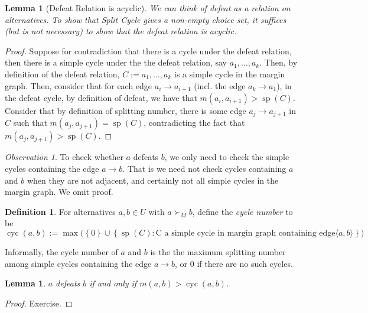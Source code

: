 \documentclass{book}
\theoremstyle{plain}
\newtheorem{lemma}[theorem]{Lemma}
\theoremstyle{definition}
\newtheorem{definition}[theorem]{Definition}
\theoremstyle{remark}
\newtheorem{observation}[theorem]{Observation}
\newcommand{\set}[1]{\left\{#1\right\}}
\begin{document}
\begin{lemma}[Defeat Relation is acyclic]
    We can think of \emph{defeat} as a relation on alternatives.
    To show that 
    Split Cycle gives a non-empty 
    choice set, it suffices
    (but is not necessary) to show that
    the defeat relation is acyclic.
\end{lemma}
\begin{proof}
    Suppose for contradiction that 
    there is a cycle under the defeat relation,
    then there is a 
    simple cycle under the 
    the defeat relation, say 
    $a_1, \dots, a_k$.
    Then, by definition of the defeat relation,
    $C := a_1, \dots, a_k$ is a simple cycle in the 
    margin graph.
    Then, consider that 
    for each edge $a_i \to a_{i+1}$ (incl. the edge $a_k \to a_1$),
    in the defeat cycle, 
    by definition of defeat, we have that $m(a_i, a_{i+1}) > \operatorname{sp}(C)$.
    Consider that by definition of splitting number, there is some edge $a_j \to a_{j+1}$ in $C$ such that
    $m(a_j, a_{j+1}) = \operatorname{sp}(C)$, contradicting 
    the fact that $m(a_j, a_{j+1}) > \operatorname{sp}(C)$.
\end{proof}

\begin{observation}
    To check whether 
    $a$ defeats $b$, we only need to check the simple cycles containing 
    the edge $a \to b$. 
    That is we need not check 
    cycles containing 
    $a$ and $b$ when they are not adjacent, and certainly not 
    all simple cycles in the margin graph. We omit proof.
\end{observation}

\begin{definition}
    For alternatives $a, b \in U$ with 
    $a \succ_M b$, define the \emph{cycle number} to be 
    \[
        \operatorname{cyc}(a, b) := \max \bigg(\set{0} \cup
            \set{\operatorname{sp}(C) :  \text{C a simple cycle in margin graph 
            containing edge} \langle a, b \rangle}
        \bigg)
    \]

    Informally, 
    the cycle number of $a$ and $b$ is the
    the maximum splitting number among simple cycles containing the edge $a \to b$, 
    or $0$ if there are no such cycles.
\end{definition}

\begin{lemma}
    $a$ defeats $b$ if and only if 
    $m(a, b) > \operatorname{cyc}(a, b)$.
\end{lemma}
\begin{proof}
   Exercise. 
\end{proof}
\end{document}
